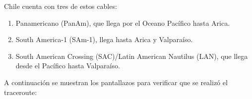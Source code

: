 \documentclass[paper=a4, fontsize=11pt]{scrartcl}
\numberwithin{equation}{section}		%
\numberwithin{figure}{section}			%
\numberwithin{table}{section}				%
\begin{document}
Chile cuenta con tres de estos cables:\\
\begin{enumerate}
\item Panamericano (PanAm), que llega por el Oceano Pac\'ifico hasta Arica.\\
\item South America-1 (SAm-1), llega hasta Arica y Valpara\'iso.\\
\item South American Crossing (SAC)/Latin American Nautilus (LAN), que llega desde el Pac\'ifico hasta Valpara\'iso.\\
\end{enumerate}

A continuación se muestran los pantallazos para verificar que se realizó el traceroute:\\
\end{document}
